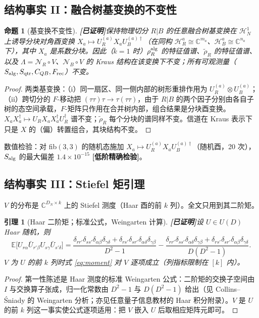 \documentclass[11pt,a4paper]{ctexart}
\newtheorem{proposition}{命题}
\newtheorem{lemma}{引理}
\theoremstyle{definition}
\newcommand{\proved}{\textcolor{green!45!black}{\textbf{[已证明]}}}
\newcommand{\loword}{\textcolor{orange!80!black}{\textbf{[低阶精确检验]}}}
\newcommand{\E}{\mathbb{E}}
\newcommand{\C}{\mathbb{C}}
\begin{document}
\subsection{结构事实 II：融合树基变换的不变性}
\label{ssec:basis}

\begin{proposition}[基变换不变性]\proved{}\label{prop:basis}
保持物理切分 $R|B$ 的任意融合树基变换在 $\mathcal H_N^1$ 上诱导分块对角酉变换
$X_a\mapsto U_R^{(a)}X_aU_B^{(a)\dagger}$（在同构 $\mathcal H_R^a\cong\C^{m_a}$、$\mathcal H_B^a\cong\C^{n_a}$ 下），其中 $X_a$ 是系数分块。因此（$k=1$ 时）$\rho_R^{\rm alg}$ 的特征值谱、$\widetilde\rho_R$ 的特征值谱、以及 $\Lambda=\mathcal N_R\circ V$、$\mathcal N_B\circ V$ 的 Kraus 结构在该变换下不变；所有可观测量（$S_{\rm alg},S_{\rm qtr},C_{QB},F_{\rm rec}$）不变。
\end{proposition}
\begin{proof}
两类基变换：（i）同一扇区、同一侧内部的树形重排作用为 $U_R^{(a)}\otimes U_B^{(a)}$；（ii）跨切分的 $F$-移动把 $(\tau\tau)\tau\to\tau(\tau\tau)$，由于 $R|B$ 的两个因子分别由各自子树的态空间承载，$F$-矩阵只作用在合并树内部，组合结果是分块酉变换。$X_aX_a^\dagger\mapsto U_RX_aX_a^\dagger U_R^\dagger$ 谱不变；$\widetilde\rho_R$ 每个分块的谱同样不变。信道在 Kraus 表示下只是 $X$ 的（偏）转置组合，其块结构不变。
\end{proof}
数值检验：对 fib$(3,3)$ 的随机态施加 $X_a\mapsto U_R^{(a)}X_aU_B^{(a)\dagger}$（随机酉，20 次），$S_{\rm alg}$ 的最大偏差 $1.4\times10^{-15}$ \loword{}。

\subsection{结构事实 III：Stiefel 矩引理}
\label{ssec:stiefel}

$V$ 的分布是 $\C^{D_N\times k}$ 上的 Stiefel 测度（Haar 酉的前 $k$ 列）。全文只用到其二阶矩。

\begin{lemma}[Haar 二阶矩；标准公式，Weingarten 计算]\proved{}\label{lem:moment}
设 $U\in U(D)$ Haar 随机，则
\begin{equation}\label{eq:moment}
\E\big[U_{r\alpha}\bar U_{r'\beta}U_{s\gamma}\bar U_{s'\delta}\big]
=\frac{\delta_{rr'}\delta_{ss'}\delta_{\alpha\beta}\delta_{\gamma\delta}+\delta_{rs'}\delta_{sr'}\delta_{\alpha\delta}\delta_{\gamma\beta}}{D^2-1}
-\frac{\delta_{rr'}\delta_{ss'}\delta_{\alpha\delta}\delta_{\gamma\beta}+\delta_{rs'}\delta_{sr'}\delta_{\alpha\beta}\delta_{\gamma\delta}}{D(D^2-1)} .
\end{equation}
$V$ 为 $U$ 的前 $k$ 列时式 \eqref{eq:moment} 对 $V$ 逐项成立（列指标限制在 $[k]$ 内）。
\end{lemma}
\begin{proof}
第一性陈述是 Haar 测度的标准 Weingarten 公式：二阶矩的交换子空间由 $I$ 与交换算子张成，归一化常数由 $D^2-1$ 与 $D(D^2-1)$ 给出（见 Collins--\'Sniady 的 Weingarten 分析；亦见任意量子信息教材的 Haar 积分附录）。$V$ 是 $U$ 的前 $k$ 列这一事实使公式逐项适用：把 $V$ 嵌入 $U$ 后取相应矩阵元即可。
\end{proof}
\end{document}
